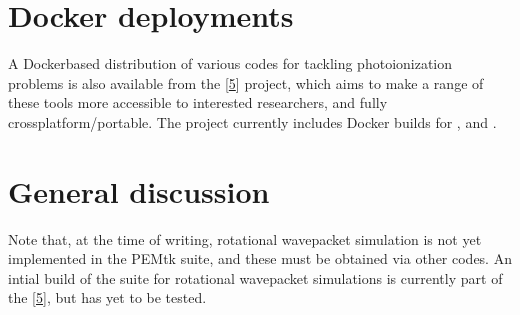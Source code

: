 \documentclass[letterpaper,table,10pt,english]{jupyterBook}
\begin{document}
\section{Docker deployments}
\label{\detokenize{part1/platform_intro_071122:docker-deployments}}\label{\detokenize{part1/platform_intro_071122:sect-platform-docker}}
\sphinxAtStartPar
A Docker\sphinxhyphen{}based distribution of various codes for tackling
photoionization problems is also available from the  {[}\hyperlink{cite.backmatter/bibliography:id621}{5}{]}
project, which aims to make a range of these tools more accessible to
interested researchers, and fully cross\sphinxhyphen{}platform/portable. The project currently includes Docker builds for ,  and .


\section{General discussion}
\label{\detokenize{part1/platform_intro_071122:general-discussion}}\label{\detokenize{part1/platform_intro_071122:sect-platform-general}}
\sphinxAtStartPar
Note that, at the time of writing, rotational wavepacket simulation is
not yet implemented in the PEMtk suite, and these must be obtained via
other codes. An intial build of the  suite for rotational wavepacket simulations is currently part of the  {[}\hyperlink{cite.backmatter/bibliography:id621}{5}{]}, but has yet to be tested.

\sphinxstepscope
\end{document}
